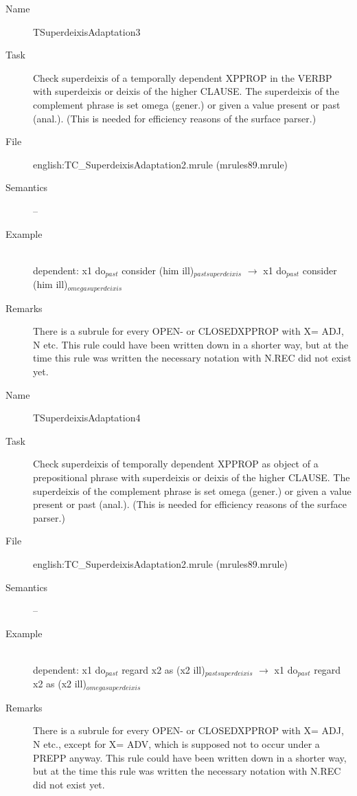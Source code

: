 \begin{description}
\vspace{1 cm}
\begin{description}
\item[Name]   TSuperdeixisAdaptation3
\item[Task] 
Check superdeixis of a temporally dependent XPPROP in the VERBP with 
superdeixis or deixis of the higher CLAUSE.
The superdeixis of the complement phrase is set omega (gener.) or given a 
value present or past (anal.). (This is needed for efficiency 
reasons of the surface parser.) 
\item[File] english:TC\_SuperdeixisAdaptation2.mrule (mrules89.mrule)
\item[Semantics] --
\item[Example] \mbox{}\\
dependent: 
x1 do$_{past}$ consider (him ill)$_{pastsuperdeixis}$ $\rightarrow$
x1 do$_{past}$ consider (him ill)$_{omegasuperdeixis}$
\item[Remarks] 
There is a subrule for every OPEN- or CLOSEDXPPROP with X= ADJ, N etc. This 
rule could have been
written down in a shorter way, but at the time this rule was 
written the necessary notation with N.REC did not exist yet.
\end{description}

\vspace{1 cm}
\begin{description}
\item[Name]   TSuperdeixisAdaptation4
\item[Task] 
 Check superdeixis of temporally dependent XPPROP as object of a prepositional 
phrase with superdeixis or deixis of the higher CLAUSE.
The superdeixis of the complement phrase is set omega (gener.) or given a 
value present or past (anal.). (This is needed for efficiency 
reasons of the surface parser.) 
\item[File] english:TC\_SuperdeixisAdaptation2.mrule (mrules89.mrule)
\item[Semantics] --
\item[Example] \mbox{}\\
dependent: 
x1 do$_{past}$ regard x2 as (x2 ill)$_{pastsuperdeixis}$ $\rightarrow$
x1 do$_{past}$ regard x2 as (x2 ill)$_{omegasuperdeixis}$
\item[Remarks]
There is a subrule for every OPEN- or CLOSEDXPPROP with X= ADJ, N etc., except 
for X= ADV, which is supposed not to occur under a PREPP anyway. This 
rule could have been
written down in a shorter way, but at the time this rule was 
written the necessary notation with N.REC did not exist yet.
\end{description}


\end{description}

